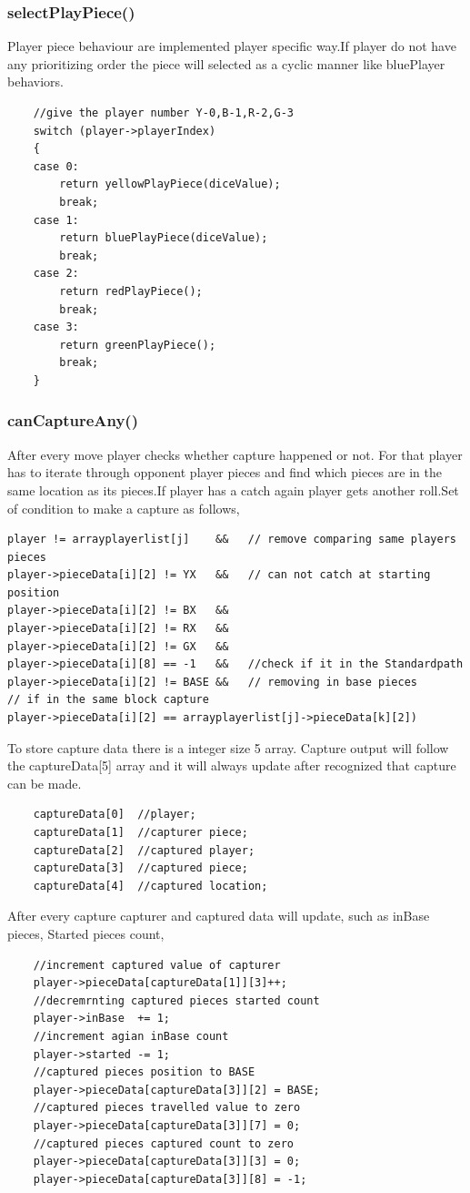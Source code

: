 \documentclass{article}
\begin{document}
\subsubsection{selectPlayPiece()}
Player piece behaviour are implemented player specific way.If player do not have any prioritizing order the piece will selected as a cyclic manner like bluePlayer behaviors.
\begin{verbatim}
    //give the player number Y-0,B-1,R-2,G-3
    switch (player->playerIndex) 
    {
    case 0:
        return yellowPlayPiece(diceValue);
        break;
    case 1:
        return bluePlayPiece(diceValue);
        break;
    case 2:
        return redPlayPiece();
        break;
    case 3:
        return greenPlayPiece();
        break;
    }
\end{verbatim}

\subsubsection{canCaptureAny()}
After every move player checks whether capture happened or not. For that player has to iterate through opponent player pieces and find which pieces are in the same location as its pieces.If player has a catch again player gets another roll.Set of condition to make a capture as follows,
\begin{verbatim}
player != arrayplayerlist[j]    &&   // remove comparing same players pieces
player->pieceData[i][2] != YX   &&   // can not catch at starting position
player->pieceData[i][2] != BX   &&
player->pieceData[i][2] != RX   &&
player->pieceData[i][2] != GX   &&
player->pieceData[i][8] == -1   &&   //check if it in the Standardpath
player->pieceData[i][2] != BASE &&   // removing in base pieces
// if in the same block capture 
player->pieceData[i][2] == arrayplayerlist[j]->pieceData[k][2])
\end{verbatim}

To store capture data there is a integer size 5 array. Capture output will follow the captureData[5] array and it will always update after recognized that capture can be made.
\begin{verbatim}
    captureData[0]  //player;
    captureData[1]  //capturer piece;
    captureData[2]  //captured player;
    captureData[3]  //captured piece;
    captureData[4]  //captured location;
\end{verbatim}

After every capture capturer and captured data will update, such as inBase pieces, Started pieces count,
\begin{verbatim}
    //increment captured value of capturer
    player->pieceData[captureData[1]][3]++;
    //decremrnting captured pieces started count
    player->inBase  += 1;
    //increment agian inBase count
    player->started -= 1;
    //captured pieces position to BASE
    player->pieceData[captureData[3]][2] = BASE;
    //captured pieces travelled value to zero
    player->pieceData[captureData[3]][7] = 0;
    //captured pieces captured count to zero
    player->pieceData[captureData[3]][3] = 0;
    player->pieceData[captureData[3]][8] = -1;
\end{verbatim}
\end{document}
